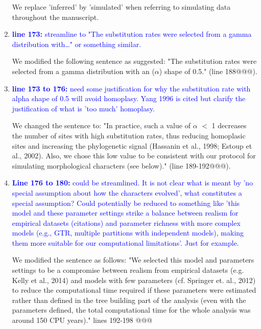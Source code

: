 \documentclass[12pt,letterpaper]{article}
\begin{document}
\begin{enumerate}
We replace 'inferred' by 'simulated' when referring to simulating data throughout the manuscript.

\item{\textcolor{blue}{\textbf{line 173:} streamline to "The substitution rates were selected from a gamma distribution with…" or something similar. }}

We modified the following sentence as suggested: "The substitution rates were selected from a gamma distribution with an ($\alpha$) shape of 0.5." (line 188@@@).

\item{\textcolor{blue}{\textbf{line 173 to 176:} need some justification for why the substitution rate with alpha shape of 0.5  will avoid homoplasy. Yang 1996 is cited but clarify the justification of what is 'too much' homoplasy. }}

We changed the sentence to:
"In practice, such a value of $\alpha$ $<$ 1 decreases the number of sites with high substitution rates, thus reducing homoplasic sites and increasing the phylogenetic signal (Hassanin et al., 1998; Estoup et al., 2002).%
Also, we chose this low value to be consistent with our protocol for simulating morphological characters (see below)." (line 189-192@@@).

\item{\textcolor{blue}{\textbf{Line 176 to 180:} could be streamlined. It is not clear what is meant by 'no special assumption about how the characters evolved', what constitutes a special assumption? Could potentially be reduced to something like 'this model and these parameter settings strike a balance between realism for empirical datasets (citations) and parameter richness with more complex models (e.g., GTR, multiple partitions with independent models), making them more suitable for our computational limitations'. Just for example.}}

We modified the sentence as follows:
"We selected this model and parameters settings to be a compromise between realism from empirical datasets (e.g. Kelly et al., 2014) and models with few parameters (cf. Springer et. al., 2012) to reduce the computational time required if these parameters were estimated rather than defined in the tree building part of the analysis (even with the parameters defined, the total computational time for the whole analysis was around 150 CPU years)." lines 192-198 @@@


\end{enumerate}
\end{document}
